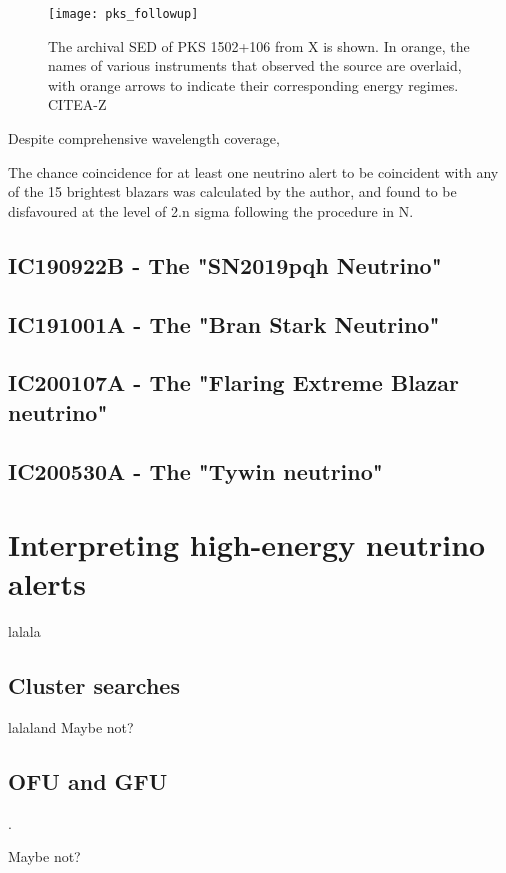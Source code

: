 \begin{figure}[!ht]
	\centering \texttt{[image: pks\_followup]}
	\caption{The archival SED of PKS 1502+106 from X is shown. In orange, the names of various instruments that observed the source are overlaid, with orange arrows to indicate their corresponding energy regimes. CITEA-Z}
	\label{fig:PKSobs}
\end{figure}

Despite comprehensive wavelength coverage, 

The chance coincidence for at least one neutrino alert to be coincident with any of the  15 brightest blazars was calculated by the author, and found to be disfavoured at the level of 2.n sigma following the procedure in N. 

\subsection{IC190922B - The "SN2019pqh Neutrino"}

\subsection{IC191001A - The "Bran Stark Neutrino"}

\subsection{IC200107A - The "Flaring Extreme Blazar neutrino"}

\subsection{IC200530A - The "Tywin neutrino"}

\section{Interpreting high-energy neutrino alerts}

lalala

\subsection{Cluster searches}
lalaland Maybe not?

\subsection{OFU and GFU}.

Maybe not?